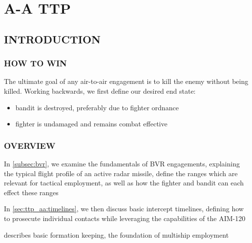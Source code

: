 \chapter{A-A TTP}
\localtableofcontents
\thispagestyle{plain}
\cleardoublepage

\section{INTRODUCTION}
\subsection{HOW TO WIN}
\begin{tcoloritemize}
    \blueitem[Goal]
    The ultimate goal of any air-to-air engagement is to kill the enemy without being killed. 
    Working backwards, we first define our desired end state:
    \begin{itemize}
        \item bandit is destroyed, preferably due to fighter ordnance
        \item fighter is undamaged and remains combat effective
    \end{itemize}
\end{tcoloritemize}

\subsection{OVERVIEW}
\begin{tcoloritemize}
    \blueitem[Fundamentals] 
    In \cref{subsec:bvr}, 
    we examine the fundamentals of BVR engagements, 
    explaining the typical flight profile of an active radar missile,
    define the ranges which are relevant for tactical employment,
    as well as how the fighter and bandit can each effect these ranges

    In \cref{sec:ttp_aa:timelines}, 
    we then discuss basic intercept timelines, 
    defining how to prosecute individual contacts while leveraging the capabilities of the AIM-120
    
    \blueitem[Formation]
     describes basic formation keeping, the foundation of multiship employment
\end{tcoloritemize}

\clearpage



